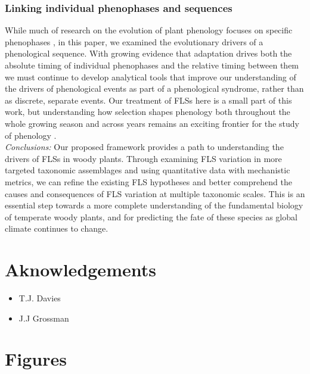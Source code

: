 \documentclass{article}
\begin{document}
\subsubsection*{Linking individual phenophases and sequences} %
\noindent While much of research on the evolution of plant phenology focuses on specific phenophases  \citep[e.g.][]{Savage2013,OLLERTON_1992}, in this paper, we examined the evolutionary drivers of a phenological sequence. With growing evidence that adaptation drives both the absolute timing of individual phenophases and the relative timing between them we must continue to develop analytical tools that improve our understanding of the drivers of phenological events as part of a phenological syndrome, rather than as discrete, separate events. %
Our treatment of FLSs here is a small part of this work, but understanding how selection shapes phenology both throughout the whole growing season and across years remains an exciting frontier for the study of phenology \citep{Wolkovich2014b}. \\

\noindent \emph{Conclusions:} Our proposed framework provides a path to understanding the drivers of FLSs in woody plants. Through examining FLS variation in more targeted taxonomic assemblages and using quantitative data with mechanistic metrics, we can refine the existing FLS hypotheses and better comprehend the causes and consequences of FLS variation at multiple taxonomic scales. This is an essential step towards a more complete understanding of the fundamental biology of temperate woody plants, and for predicting the fate of these species as global climate continues to change.

\section*{Aknowledgements}
\begin{itemize}
\item T.J. Davies
\item J.J Grossman
\end{itemize}




\section*{Figures}
\end{document}
